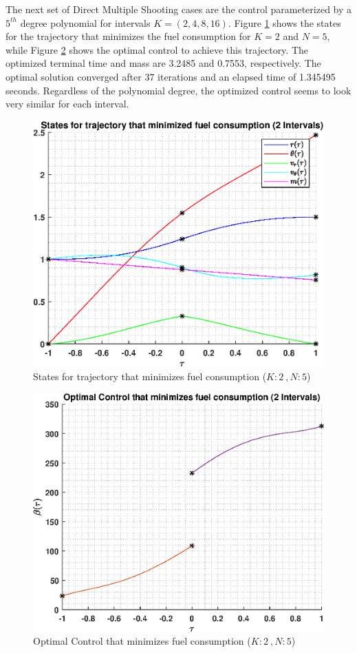 \documentclass[]{article}
\begin{document}
The next set of Direct Multiple Shooting cases are the control parameterized by a \(5^{th}\) degree polynomial for intervals \(K = (2,4,8,16)\). Figure \ref{fig:directStatesK2Poly5} shows the states for the trajectory that minimizes the fuel consumption for \(K = 2\) and  \(N = 5\), while Figure \ref{fig:directControlK2Poly5} shows the optimal control to achieve this trajectory. The optimized terminal time and mass are 3.2485 and 0.7553, respectively. The optimal solution converged after 37 iterations and an elapsed time of 1.345495 seconds. Regardless of the polynomial degree, the optimized control seems to look very similar for each interval.
\begin{figure}
	\centering
	\includegraphics[scale=0.75]{directStatesK2Poly5.eps}
	\caption{States for trajectory that minimizes fuel consumption (\(K:2\ , N:5\))}
	\label{fig:directStatesK2Poly5}
\end{figure}
\begin{figure}
	\centering
	\includegraphics[scale=0.75]{directControlK2Poly5.eps}
	\caption{Optimal Control that minimizes fuel consumption (\(K:2\ , N:5\))}
	\label{fig:directControlK2Poly5}
\end{figure}
\FloatBarrier
\end{document}
